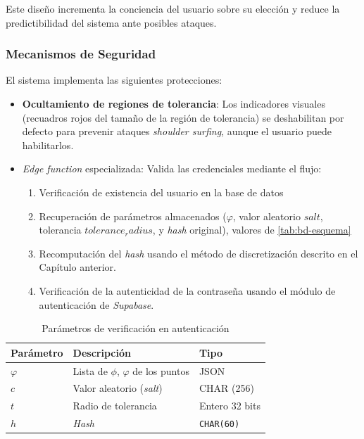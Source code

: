 Este diseño incrementa la conciencia del usuario sobre su elección y reduce la predictibilidad del sistema ante posibles ataques.

\subsubsection{Mecanismos de Seguridad}
El sistema implementa las siguientes protecciones:

\begin{itemize}
	\item \textbf{Ocultamiento de regiones de tolerancia}: Los indicadores visuales (recuadros rojos del tama\~no de la regi\'on de tolerancia) se deshabilitan por defecto para prevenir ataques \textit{shoulder surfing}, aunque el usuario puede habilitarlos.
	\item \textit{Edge function} especializada: Valida las credenciales mediante el flujo:
	\begin{enumerate}
		\item Verificación de existencia del usuario en la base de datos
		\item Recuperación de parámetros almacenados ($\varphi$, valor aleatorio $salt$, tolerancia $tolerance_radius$, y \textit{hash} original), valores de \ref{tab:bd-esquema}
		\item Recomputación del \textit{hash} usando el método de discretización descrito en el Capítulo anterior.
		\item Verificaci\'on de la autenticidad de la contrase\~na usando el m\'odulo de autenticaci\'on de \textit{Supabase}.
	\end{enumerate}
\end{itemize}

\begin{table}[ht]
	\centering
	\caption{Parámetros de verificación en autenticación}
	\label{tab:parametros-verificacion}
	\begin{tabularx}{\textwidth}{lXl}
		\toprule
		\textbf{Parámetro} & \textbf{Descripción} & \textbf{Tipo} \\
		\midrule
		$\varphi$ & Lista de $\phi$, $\varphi$ de los puntos & JSON \\
		$c$ & Valor aleatorio  (\textit{salt}) & CHAR (256) \\
		$t$ & Radio de tolerancia & Entero 32 bits \\
		$h$ & \textit{Hash} & \texttt{CHAR(60)} \\
		\bottomrule
	\end{tabularx}
\end{table}


